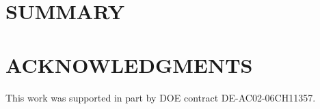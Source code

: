 \documentclass{aip-cp}
\begin{document}



\section{SUMMARY}





\section{ACKNOWLEDGMENTS}

This work was supported in part by DOE contract DE-AC02-06CH11357.


\nocite{*}
%
%
\end{document}
